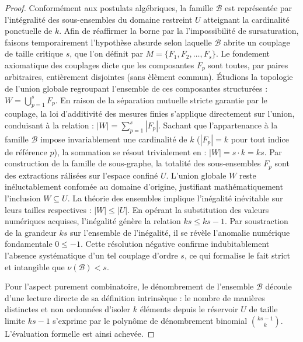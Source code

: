 \documentclass[12pt]{article}
\begin{document}
\begin{proof}
Conform\'ement aux postulats alg\'ebriques, la famille $\mathcal{B}$ est repr\'esent\'ee par l'int\'egralit\'e des sous-ensembles du domaine restreint $U$ atteignant la cardinalit\'e ponctuelle de $k$.
Afin de r\'eaffirmer la borne par la l'impossibilit\'e de sursaturation, faisons temporairement l'hypoth\`ese absurde selon laquelle $\mathcal{B}$ abrite un couplage de taille critique $s$, que l'on d\'efinit par $M = \{F_1, F_2, \ldots, F_s\}$.
Le fondement axiomatique des couplages dicte que les composantes $F_p$ sont toutes, par paires arbitraires, enti\`erement disjointes (sans \`el\`ement commun).
\'Etudions la topologie de l'union globale regroupant l'ensemble de ces composantes structur\'ees : $W = \bigcup_{p=1}^s F_p$.
En raison de la s\'eparation mutuelle stricte garantie par le couplage, la loi d'additivit\'e des mesures finies s'applique directement sur l'union, conduisant \`a la relation : $|W| = \sum_{p=1}^s |F_p|$.
Sachant que l'appartenance \`a la famille $\mathcal{B}$ impose invariablement une cardinalit\'e de $k$ ($|F_p| = k$ pour tout indice de r\'ef\'erence $p$), la sommation se r\'esout trivialement en : $|W| = s \cdot k = ks$.
Par construction de la famille de sous-graphe, la totalit\'e des sous-ensembles $F_p$ sont des extractions r\'alis\'ees sur l'espace confin\'e $U$.
L'union globale $W$ reste in\'eluctablement confom\'ee au domaine d'origine, justifiant math\'ematiquement l'inclusion $W \subseteq U$.
La th\'eorie des ensembles implique l'in\'egalit\'e in\'evitable sur leurs tailles respectives : $|W| \le |U|$.
En op\'erant la substitution des valeurs num\'eriques acquises, l'in\'egalit\'e g\'en\`ere la relation $ks \le ks - 1$.
Par soustraction de la grandeur $ks$ sur l'ensemble de l'in\'egalit\'e, il se r\'ev\`ele l'anomalie num\'erique fondamentale $0 \le -1$.
Cette r\'esolution n\'egative confirme indubitablement l'absence syst\'ematique d'un tel couplage d'ordre $s$, ce qui formalise le fait strict et intangible que $\nu(\mathcal{B}) < s$.

Pour l'aspect purement combinatoire, le d\'enombrement de l'ensemble $\mathcal{B}$ d\'ecoule d'une lecture directe de sa d\'efinition intrins\`eque : le nombre de mani\`eres distinctes et non ordonn\'ees d'isoler $k$ \'el\'ements depuis le r\'eservoir $U$ de taille limite $ks - 1$ s'exprime par le polyn\^ome de d\'enombrement binomial $\binom{ks - 1}{k}$.
L'\'evaluation formelle est ainsi achev\'ee.
\end{proof}

\newpage
\end{document}
